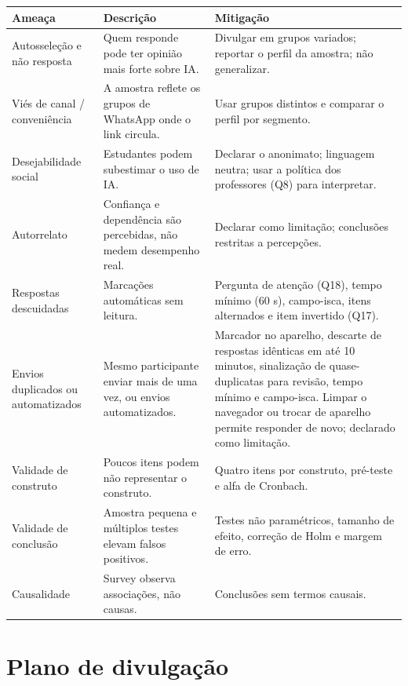 \documentclass[11pt,a4paper]{article}
\begin{document}
{\small
\begin{longtable}{@{}>{\raggedright\arraybackslash}p{3.3cm} >{\raggedright\arraybackslash}p{5.5cm} >{\raggedright\arraybackslash}p{6.7cm}@{}}
\toprule
\textbf{Ameaça} & \textbf{Descrição} & \textbf{Mitigação} \\
\midrule
\endhead
Autosseleção e não resposta & Quem responde pode ter opinião mais forte sobre IA. & Divulgar em grupos variados; reportar o perfil da amostra; não generalizar. \\
Viés de canal / conveniência & A amostra reflete os grupos de WhatsApp onde o link circula. & Usar grupos distintos e comparar o perfil por segmento. \\
Desejabilidade social & Estudantes podem subestimar o uso de IA. & Declarar o anonimato; linguagem neutra; usar a política dos professores (Q8) para interpretar. \\
Autorrelato & Confiança e dependência são percebidas, não medem desempenho real. & Declarar como limitação; conclusões restritas a percepções. \\
Respostas descuidadas & Marcações automáticas sem leitura. & Pergunta de atenção (Q18), tempo mínimo (60 s), campo-isca, itens alternados e item invertido (Q17). \\
Envios duplicados ou automatizados & Mesmo participante enviar mais de uma vez, ou envios automatizados. & Marcador no aparelho, descarte de respostas idênticas em até 10 minutos, sinalização de quase-duplicatas para revisão, tempo mínimo e campo-isca. Limpar o navegador ou trocar de aparelho permite responder de novo; declarado como limitação. \\
Validade de construto & Poucos itens podem não representar o construto. & Quatro itens por construto, pré-teste e alfa de Cronbach. \\
Validade de conclusão & Amostra pequena e múltiplos testes elevam falsos positivos. & Testes não paramétricos, tamanho de efeito, correção de Holm e margem de erro. \\
Causalidade & Survey observa associações, não causas. & Conclusões sem termos causais. \\
\bottomrule
\end{longtable}}

\section{Plano de divulgação}
\end{document}
